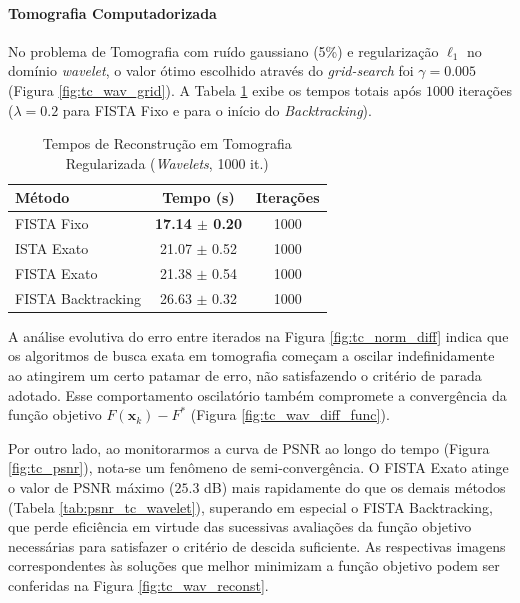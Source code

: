 \documentclass[12pt]{article}
\begin{document}
\paragraph{Tomografia Computadorizada}
No problema de Tomografia com ruído gaussiano (5\%) e regularização $\ell_1$ no domínio \textit{wavelet}, o valor ótimo escolhido através do \textit{grid-search} foi $\gamma = 0.005$ (Figura \ref{fig:tc_wav_grid}). A Tabela \ref{tab:tempos_tc_wavelet} exibe os tempos totais após $1000$ iterações ($\lambda = 0.2$ para FISTA Fixo e para o início do \textit{Backtracking}).

\begin{table}[H]
    \centering
    \caption{Tempos de Reconstrução em Tomografia Regularizada (\textit{Wavelets}, 1000 it.)}
    \label{tab:tempos_tc_wavelet}
    \begin{tabular}{lcc}
        \toprule
        \textbf{Método} & \textbf{Tempo (s)} & \textbf{Iterações} \\
        \midrule
        FISTA Fixo & \textbf{17.14 $\pm$ 0.20} & 1000 \\
        ISTA Exato & 21.07 $\pm$ 0.52 & 1000 \\
        FISTA Exato & 21.38 $\pm$ 0.54 & 1000 \\
        FISTA Backtracking & 26.63 $\pm$ 0.32 & 1000 \\
        \bottomrule
    \end{tabular}
\end{table}

A análise evolutiva do erro entre iterados na Figura \ref{fig:tc_norm_diff} indica que os algoritmos de busca exata em tomografia começam a oscilar indefinidamente ao atingirem um certo patamar de erro, não satisfazendo o critério de parada adotado. Esse comportamento oscilatório também compromete a convergência da função objetivo $F(\mathbf{x}_k) - F^*$ (Figura \ref{fig:tc_wav_diff_func}). 

Por outro lado, ao monitorarmos a curva de PSNR ao longo do tempo (Figura \ref{fig:tc_psnr}), nota-se um fenômeno de semi-convergência. O FISTA Exato atinge o valor de PSNR máximo ($25.3$ dB) mais rapidamente do que os demais métodos (Tabela \ref{tab:psnr_tc_wavelet}), superando em especial o FISTA Backtracking, que perde eficiência em virtude das sucessivas avaliações da função objetivo necessárias para satisfazer o critério de descida suficiente. As respectivas imagens correspondentes às soluções que melhor minimizam a função objetivo podem ser conferidas na Figura \ref{fig:tc_wav_reconst}.
\end{document}
